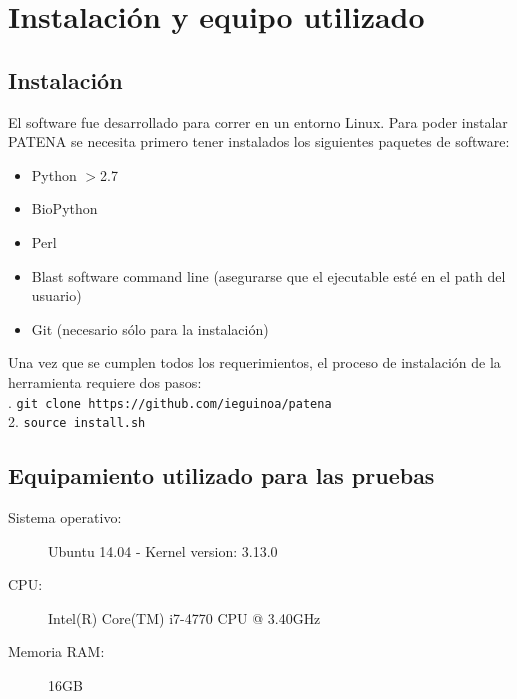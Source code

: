 \chapter{Instalación y equipo utilizado}\label{equipo}

\section{Instalación}\label{install}

El software fue desarrollado para correr en un entorno Linux.
Para poder instalar PATENA se necesita primero tener instalados los siguientes paquetes de software:

\begin{itemize}
 \item Python $>$2.7 \cite{python}
 \item BioPython \cite{biopython}
 \item Perl \cite{perl}
 \item Blast software command line \cite{blastLocal} (asegurarse que el ejecutable esté en el path del usuario)
 \item Git \cite{git} (necesario sólo para la instalación)
\end{itemize}

Una vez que se cumplen todos los requerimientos, el proceso de instalación de la herramienta requiere dos pasos: \\ 

. \hspace{0.5cm} \texttt{git clone https://github.com/ieguinoa/patena}\\
2. \hspace{0.5cm} \texttt{source install.sh}







\section{Equipamiento utilizado para las pruebas}\label{equipamiento}


\begin{center}
\begin{description}
 \item[Sistema operativo:] Ubuntu 14.04 - Kernel version: 3.13.0
\item[CPU:] Intel(R) Core(TM) i7-4770 CPU @ 3.40GHz
\item[Memoria RAM:] 16GB
\end{description}
\end{center}


